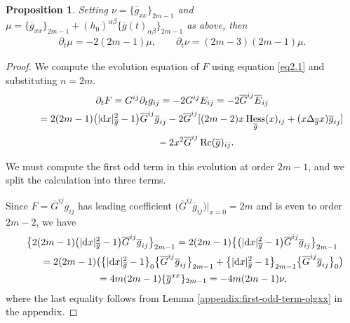\documentclass[pdftex]{sigma}
\numberwithin{equation}{section}
\newtheorem{Proposition}[Theorem]{Proposition}
 { \theoremstyle{definition}
\newtheorem{Definition}[Theorem]{Definition}
\newtheorem{Example}[Theorem]{Example}
\newtheorem{Remark}[Theorem]{Remark} }
\newcommand{\olg}{\overline{g}}
\newcommand{\olG}{\overline{G}}
\newcommand{\gbar}{\overline{g}}
\DeclareMathOperator{\Rc}{Rc}
\DeclareMathOperator{\hess}{Hess}
\begin{document}
\begin{Proposition} \label{prop:linear-system} Setting $\nu = \{\olg_{xx}\}_{2m-1}$ and $\mu = \{\olg_{xx}\}_{2m-1} + (h_0)^{\alpha \beta} \{\olg(t)_{\alpha \beta}\}_{2m-1}$
as above, then
\begin{gather*}%
 \partial_t \mu = -2(2m-1) \mu, \qquad
 \partial_t \nu = (2m-3)(2m-1) \mu.
\end{gather*}
\end{Proposition}
\begin{proof}We compute the evolution equation of $F$ using equation \eqref{eq2.1} and substituting $n = 2m$.
\begin{gather*}%
\partial_t F = G^{ij} \partial_t g_{ij} = - 2 G^{ij} E_{ij} = -2 \olG^{ij} \overline{E}_{ij} \\
\hphantom{\partial_t F}{} = 2 (2m-1) \big(|{\rm d}x|^2_{\gbar}-1\big) \olG^{ij} \olg_{ij} -2 \olG^{ij} [ (2m-2) x\hess_{\olg} (x)_{ij} +(x\Delta_{\olg} x) \olg_{ij} ]\\
\hphantom{\partial_t F=}{} -2 x^2\olG^{ij}\Rc(\gbar)_{ij} .
\end{gather*}

We must compute the first odd term in this evolution at order $2m-1$, and we split the calculation into three terms.

Since
$F = \olG^{ij} \olg_{ij}$ has leading coefficient $\big(\olG^{ij} \olg_{ij} \big)\vert_{x=0} = 2m$ and is even to order $2m-2$, we have
\begin{gather*}%
\big\{ 2 (2m-1) \big(|{\rm d}x|^2_{\gbar}-1\big) \olG^{ij} \olg_{ij}\big\}_{2m-1}
= 2 (2m-1) \big\{\big(|{\rm d}x|^2_{\gbar}-1\big) \olG^{ij} \gbar_{ij} \big\}_{2m-1} \\
\qquad{}= 2 (2m-1) \big( \big\{|{\rm d}x|^2_{\gbar}-1\big\}_0 \big\{ \olG^{ij} \gbar_{ij}\big\}_{2m-1} + \big\{|{\rm d}x|^2_{\gbar}-1\big\}_{2m-1}
\big\{ \olG^{ij} \gbar_{ij}\big\}_{0}\big) \\
\qquad{} = 4m (2m-1) \{\gbar^{xx} \}_{2m-1} = -4m(2m-1) \nu ,
\end{gather*}
where the last equality follows from Lemma \ref{appendix:first-odd-term-olgxx} in the appendix.


\end{proof}
\end{document}
